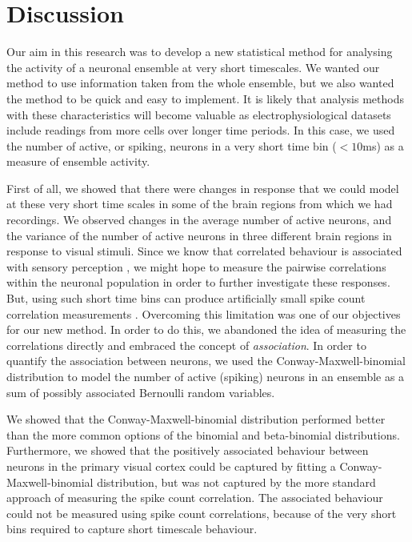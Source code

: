\section{Discussion}
Our aim in this research was to develop a new statistical method for analysing the activity of a neuronal ensemble at very short timescales. We wanted our method to use information taken from the whole ensemble, but we also wanted the method to be quick and easy to implement. It is likely that analysis methods with these characteristics will become valuable as electrophysiological datasets include readings from more cells over longer time periods. In this case, we used the number of active, or spiking, neurons in a very short time bin ($<10$ms) as a measure of ensemble activity.

First of all, we showed that there were changes in response that we could model at these very short time scales in some of the brain regions from which we had recordings. We observed changes in the average number of active neurons, and the variance of the number of active neurons in three different brain regions in response to visual stimuli. Since we know that correlated behaviour is associated with sensory perception \parencite{decharms}, we might hope to measure the pairwise correlations within the neuronal population in order to further investigate these responses. But, using such short time bins can produce artificially small spike count correlation measurements \parencite{cohen1}. Overcoming this limitation was one of our objectives for our new method. In order to do this, we abandoned the idea of measuring the correlations directly and embraced the concept of \textit{association}. In order to quantify the association between neurons, we used the Conway-Maxwell-binomial distribution to model the number of active (spiking) neurons in an ensemble as a sum of possibly associated Bernoulli random variables.

We showed that the Conway-Maxwell-binomial distribution performed better than the more common options of the binomial and beta-binomial distributions. Furthermore, we showed that the positively associated behaviour between neurons in the primary visual cortex could be captured by fitting a Conway-Maxwell-binomial distribution, but was not captured by the more standard approach of measuring the spike count correlation. The associated behaviour could not be measured using spike count correlations, because of the very short bins required to capture short timescale behaviour.

